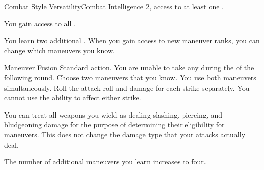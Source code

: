     \begin{feat}{Combat Style Versatility}{Combat}
        \featpre Intelligence 2, access to at least one .

         You gain access to all .

         You learn two additional .
        When you gain access to new maneuver ranks, you can change which maneuvers you know.

        \begin{activeability}{Maneuver Fusion}
            \abilityusagetime Standard action.
            \abilitycost You are unable to take any  during the  of the following round.
            \rankline
            Choose two maneuvers that you know.
            You use both maneuvers simultaneously.
            Roll the attack roll and damage for each strike separately.
            You cannot use the  ability to affect either strike.
        \end{activeability}

         You can treat all weapons you wield as dealing slashing, piercing, and bludgeoning damage for the purpose of determining their eligibility for maneuvers.
        This does not change the damage type that your attacks actually deal.

         The number of additional maneuvers you learn increases to four.
    \end{feat}

